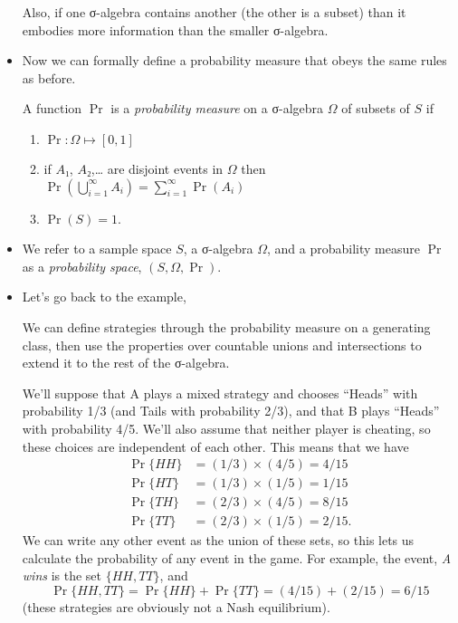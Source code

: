 \begin{itemize}
  Also, if one σ-algebra contains another (the other is a subset) than
  it embodies more information than the smaller σ-algebra.

\item Now we can formally define a probability measure that obeys the
  same rules as before.
  \begin{defn} A function $\Pr$ is a \emph{probability measure} on a
    σ-algebra $Ω$ of subsets of $S$ if
    \begin{enumerate}
    \item $\Pr: Ω ↦ [0,1]$
    \item if $A₁$, $A₂$,… are disjoint events in $Ω$ then
      $\Pr(⋃_{i=1}^∞ A_i) = ∑_{i=1}^∞ \Pr(A_i)$
    \item $\Pr(S) = 1$.
    \end{enumerate}
  \end{defn}
  
\item We refer to a sample space $S$, a σ-algebra $Ω$, and a
  probability measure $\Pr$ as a \emph{probability space}, $(S, Ω,
  \Pr)$.

\item Let's go back to the example,
  \begin{ex}
    We can define strategies through the probability measure on a
    generating class, then use the properties over countable unions
    and intersections to extend it to the rest of the σ-algebra.

    We'll suppose that A plays a mixed strategy and chooses ``Heads''
    with probability 1/3 (and Tails with probability 2/3), and that B
    plays ``Heads'' with probability 4/5.  We'll also assume that
    neither player is cheating, so these choices are independent of
    each other.  This means that we have
    \begin{align*}
      \Pr \{HH\} &= (1/3) × (4/5) = 4/15 \\
      \Pr \{HT\} &= (1/3) × (1/5) = 1/15 \\
      \Pr \{TH\} &= (2/3) × (4/5) = 8/15 \\
      \Pr \{TT\} &= (2/3) × (1/5) = 2/15.
    \end{align*}
    We can write any other event as the union of these sets, so this
    lets us calculate the probability of any event in the game.  For
    example, the event, \emph{A wins} is the set $\{HH,TT\}$, and
    \begin{equation*}
      \Pr \{HH, TT\} = \Pr \{HH\} + \Pr \{TT\} = (4/15) + (2/15) = 6/15
    \end{equation*}
    (these strategies are obviously not a Nash equilibrium).
  \end{ex}


\end{itemize}
